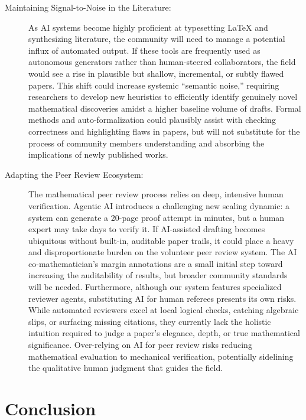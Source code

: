 \documentclass[11pt, a4paper, copyright, gdm]{google}
\begin{document}
\begin{description}
%
    
    \item[Maintaining Signal-to-Noise in the Literature:] As AI systems become highly proficient at typesetting LaTeX and synthesizing literature, the community will need to manage a potential influx of automated output.
    If these tools are frequently used as autonomous generators rather than human-steered collaborators, the field would see a rise in plausible but shallow, incremental, or subtly flawed papers.
    This shift could increase systemic ``semantic noise,'' requiring researchers to develop new heuristics to efficiently identify genuinely novel mathematical discoveries amidst a higher baseline volume of drafts.
    Formal methods and auto-formalization could plausibly assist with checking correctness and highlighting flaws in papers, but will not substitute for the process of community members understanding and absorbing the implications of newly published works.
    
    \item[Adapting the Peer Review Ecosystem:] The mathematical peer review process relies on deep, intensive human verification.
    Agentic AI introduces a challenging new scaling dynamic: a system can generate a 20-page proof attempt in minutes, but a human expert may take days to verify it.
    If AI-assisted drafting becomes ubiquitous without built-in, auditable paper trails, it could place a heavy and disproportionate burden on the volunteer peer review system.
    The AI co-mathematician's margin annotations are a small initial step toward increasing the auditability of results, but broader community standards will be needed.
    Furthermore, although our system features specialized reviewer agents, substituting AI for human referees presents its own risks.    While automated reviewers excel at local logical checks, catching algebraic slips, or surfacing missing citations, they currently lack the holistic intuition required to judge a paper's elegance, depth, or true mathematical significance.
    Over-relying on AI for peer review risks reducing mathematical evaluation to mechanical verification, potentially sidelining the qualitative human judgment that guides the field.

\end{description}

\section{Conclusion}
\end{document}
